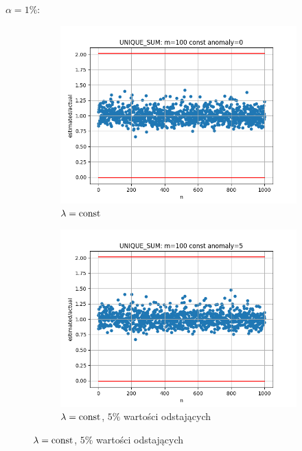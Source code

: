 \documentclass{article}
\begin{document}
    $\alpha = 1\%$:
            
    \begin{figure}[H]
        \begin{subfigure}{0.6\textwidth}
            \centering
            \includegraphics[width=\linewidth]{sum/zad1_const_0_cheb_1.png}
            \caption{$\lambda = \textnormal{const}$}
        \end{subfigure}
        \begin{subfigure}{0.6\textwidth}
            \centering
            \includegraphics[width=\linewidth]{sum/zad1_const_5_cheb_1.png}
            \caption{$\lambda = \textnormal{const}$, $5\%$ wartości odstających}
        \end{subfigure}

\end{figure}
\end{document}
